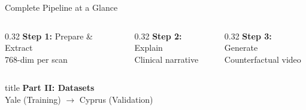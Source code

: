 \documentclass[aspectratio=169,xcolor=dvipsnames]{beamer}
\begin{document}
\begin{frame}{Complete Pipeline at a Glance}
\begin{center}
    \end{center}

    \vspace{0.3em}

    \begin{columns}
        \begin{column}{0.32\textwidth}
            \centering
            \textbf{Step 1:} Prepare \& Extract\\
            \small 768-dim per scan
        \end{column}
        \begin{column}{0.32\textwidth}
            \centering
            \textbf{Step 2:} Explain\\
            \small Clinical narrative
        \end{column}
        \begin{column}{0.32\textwidth}
            \centering
            \textbf{Step 3:} Generate\\
            \small Counterfactual video
        \end{column}
    \end{columns}
\end{frame}

\begin{frame}[plain]
    \centering
    \vfill
    \begin{beamercolorbox}[center,shadow=true,rounded=true]{title}
        \textbf{Part II: Datasets}\\
        \vspace{0.5em}
        \large Yale (Training) $\to$ Cyprus (Validation)
    \end{beamercolorbox}
    \vfill
\end{frame}
\end{document}
